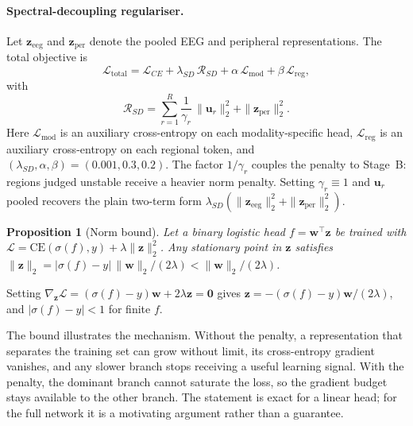 \documentclass[a4paper,fleqn]{cas-sc}
\newtheorem{proposition}{Proposition}
\begin{document}
\paragraph{Spectral-decoupling regulariser.}
Let $\mathbf{z}_{\mathrm{eeg}}$ and $\mathbf{z}_{\mathrm{per}}$ denote the pooled EEG and peripheral representations. The total objective is
\begin{equation}
\mathcal{L}_{\mathrm{total}}=\mathcal{L}_{CE}+\lambda_{SD}\,\mathcal{R}_{SD}+\alpha\,\mathcal{L}_{\mathrm{mod}}+\beta\,\mathcal{L}_{\mathrm{reg}},
\label{eq:total}
\end{equation}
with
\begin{equation}
\mathcal{R}_{SD}=\sum_{r=1}^{R}\frac{1}{\gamma_r}\,\|\mathbf{u}_r\|_2^2+\|\mathbf{z}_{\mathrm{per}}\|_2^2 .
\label{eq:sd}
\end{equation}
Here $\mathcal{L}_{\mathrm{mod}}$ is an auxiliary cross-entropy on each modality-specific head, $\mathcal{L}_{\mathrm{reg}}$ is an auxiliary cross-entropy on each regional token, and $(\lambda_{SD},\alpha,\beta)=(0.001,0.3,0.2)$. The factor $1/\gamma_r$ couples the penalty to Stage~B: regions judged unstable receive a heavier norm penalty. Setting $\gamma_r\equiv1$ and $\mathbf{u}_r$ pooled recovers the plain two-term form $\lambda_{SD}(\|\mathbf{z}_{\mathrm{eeg}}\|_2^2+\|\mathbf{z}_{\mathrm{per}}\|_2^2)$.

\begin{proposition}[Norm bound]
Let a binary logistic head $f=\mathbf{w}^{\top}\mathbf{z}$ be trained with $\mathcal{L}=\mathrm{CE}(\sigma(f),y)+\lambda\|\mathbf{z}\|_2^2$. Any stationary point in $\mathbf{z}$ satisfies $\|\mathbf{z}\|_2=|\sigma(f)-y|\,\|\mathbf{w}\|_2/(2\lambda)<\|\mathbf{w}\|_2/(2\lambda)$.
\end{proposition}
\begin{pf}
Setting $\nabla_{\mathbf{z}}\mathcal{L}=(\sigma(f)-y)\mathbf{w}+2\lambda\mathbf{z}=\mathbf{0}$ gives $\mathbf{z}=-(\sigma(f)-y)\mathbf{w}/(2\lambda)$, and $|\sigma(f)-y|<1$ for finite $f$.
\end{pf}
The bound illustrates the mechanism. Without the penalty, a representation that separates the training set can grow without limit, its cross-entropy gradient vanishes, and any slower branch stops receiving a useful learning signal. With the penalty, the dominant branch cannot saturate the loss, so the gradient budget stays available to the other branch. The statement is exact for a linear head; for the full network it is a motivating argument rather than a guarantee.
\end{document}
